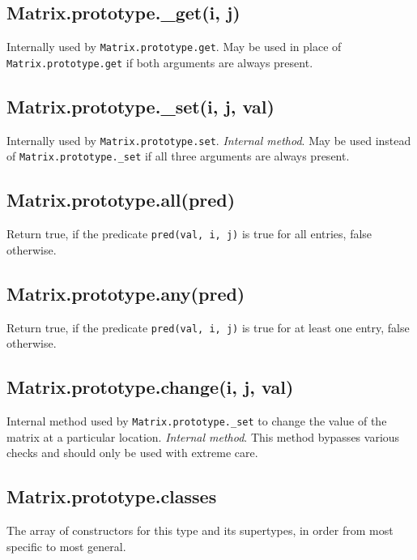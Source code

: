 \documentclass{article}
\begin{document}
    \subsection*{Matrix.prototype.\_get(i, j)}
    Internally used by \texttt{Matrix.prototype.get}. May be used in place of
\texttt{Matrix.prototype.get} if both arguments are always present.


    \subsection*{Matrix.prototype.\_set(i, j, val)}
    Internally used by \texttt{Matrix.prototype.set}. \emph{Internal method}. May be used
instead of \texttt{Matrix.prototype.\_set} if all three arguments are always present.


    \subsection*{Matrix.prototype.all(pred)}
    Return true, if the predicate \texttt{pred(val, i, j)} is true for all entries, false otherwise.


    \subsection*{Matrix.prototype.any(pred)}
    Return true, if the predicate \texttt{pred(val, i, j)} is true for at least one entry,
false otherwise.


    \subsection*{Matrix.prototype.change(i, j, val)}
    Internal method used by \texttt{Matrix.prototype.\_set} to change the value of the
matrix at a particular location. \emph{Internal method}. This method bypasses
various checks and should only be used with extreme care.


    \subsection*{Matrix.prototype.classes}
    The array of constructors for this type and its supertypes, in order from
most specific to most general.
\end{document}
